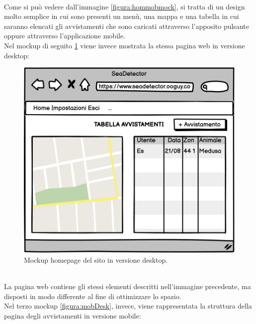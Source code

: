 \documentclass[a4paper,final,12pt]{report}
\begin{document}
\\Come si può vedere dall'immagine \ref{figura:hommobmock}, si tratta di un design molto semplice in cui sono presenti un menù, una mappa e una tabella in cui saranno elencati gli avvistamenti che sono caricati attraverso l'apposito pulsante oppure attraverso l'applicazione mobile.\\
Nel mockup di seguito \ref{figura:homeDesk} viene invece mostrata la stessa pagina web in versione desktop: 
\begin{figure}[hbtp]
\centering
\includegraphics[scale=0.90]{img_concettuale/Home.png}
\caption{Mockup homepage del sito in versione desktop.}
\label{figura:homeDesk}
\end{figure}
\\La pagina web contiene gli stessi elementi descritti nell'immagine precedente, ma disposti  in modo differente al fine di ottimizzare lo spazio.\\
Nel terzo mockup \ref{figura:mobDesk}, invece, viene rappresentata la struttura della pagina degli avvistamenti in versione mobile:
\end{document}
